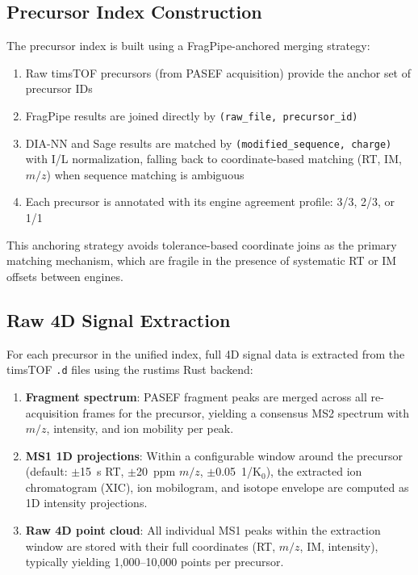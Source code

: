 \documentclass[10pt,twoside]{article}
\begin{document}
\subsection{Precursor Index Construction}

The precursor index is built using a FragPipe-anchored merging strategy:

\begin{enumerate}
    \item Raw timsTOF precursors (from PASEF acquisition) provide the anchor set of precursor IDs
    \item FragPipe results are joined directly by \texttt{(raw\_file, precursor\_id)}
    \item DIA-NN and Sage results are matched by \texttt{(modified\_sequence, charge)} with I/L normalization, falling back to coordinate-based matching (RT, IM, $m/z$) when sequence matching is ambiguous
    \item Each precursor is annotated with its engine agreement profile: 3/3, 2/3, or 1/1
\end{enumerate}

This anchoring strategy avoids tolerance-based coordinate joins as the primary matching mechanism, which are fragile in the presence of systematic RT or IM offsets between engines.

\subsection{Raw 4D Signal Extraction}

For each precursor in the unified index, full 4D signal data is extracted from the timsTOF \texttt{.d} files using the rustims Rust backend:

\begin{enumerate}
    \item \textbf{Fragment spectrum}: PASEF fragment peaks are merged across all re-acquisition frames for the precursor, yielding a consensus MS2 spectrum with $m/z$, intensity, and ion mobility per peak.
    \item \textbf{MS1 1D projections}: Within a configurable window around the precursor (default: $\pm$15~s RT, $\pm$20~ppm $m/z$, $\pm$0.05~1/K$_0$), the extracted ion chromatogram (XIC), ion mobilogram, and isotope envelope are computed as 1D intensity projections.
    \item \textbf{Raw 4D point cloud}: All individual MS1 peaks within the extraction window are stored with their full coordinates (RT, $m/z$, IM, intensity), typically yielding 1,000--10,000 points per precursor.
\end{enumerate}
\end{document}
